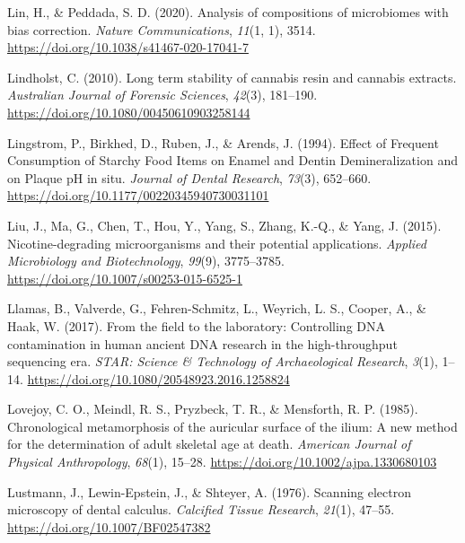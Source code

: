 \documentclass[
  letterpaper,
]{book}
\newlength{\cslhangindent}
\newlength{\cslentryspacingunit} %
\newenvironment{CSLReferences}[2] %
 {%
  \setlength{\parindent}{0pt}
  \ifodd #1
  \let\oldpar\par
  \def\par{\hangindent=\cslhangindent\oldpar}
  \fi
  \setlength{\parskip}{#2\cslentryspacingunit}
 }%
 {}
\begin{document}
\begin{CSLReferences}{1}{0}
\leavevmode{}%
Lin, H., \& Peddada, S. D. (2020). Analysis of compositions of
microbiomes with bias correction. \emph{Nature Communications},
\emph{11}(1, 1), 3514. \url{https://doi.org/10.1038/s41467-020-17041-7}

\leavevmode{}%
Lindholst, C. (2010). Long term stability of cannabis resin and cannabis
extracts. \emph{Australian Journal of Forensic Sciences}, \emph{42}(3),
181--190. \url{https://doi.org/10.1080/00450610903258144}

\leavevmode{}%
Lingstrom, P., Birkhed, D., Ruben, J., \& Arends, J. (1994). Effect of
{Frequent Consumption} of {Starchy Food Items} on {Enamel} and {Dentin
Demineralization} and on {Plaque pH} in situ. \emph{Journal of Dental
Research}, \emph{73}(3), 652--660.
\url{https://doi.org/10.1177/00220345940730031101}

\leavevmode{}%
Liu, J., Ma, G., Chen, T., Hou, Y., Yang, S., Zhang, K.-Q., \& Yang, J.
(2015). Nicotine-degrading microorganisms and their potential
applications. \emph{Applied Microbiology and Biotechnology},
\emph{99}(9), 3775--3785.
\url{https://doi.org/10.1007/s00253-015-6525-1}

\leavevmode{}%
Llamas, B., Valverde, G., Fehren-Schmitz, L., Weyrich, L. S., Cooper,
A., \& Haak, W. (2017). From the field to the laboratory: {Controlling
DNA} contamination in human ancient {DNA} research in the
high-throughput sequencing era. \emph{STAR: Science \& Technology of
Archaeological Research}, \emph{3}(1), 1--14.
\url{https://doi.org/10.1080/20548923.2016.1258824}

\leavevmode{}%
Lovejoy, C. O., Meindl, R. S., Pryzbeck, T. R., \& Mensforth, R. P.
(1985). Chronological metamorphosis of the auricular surface of the
ilium: {A} new method for the determination of adult skeletal age at
death. \emph{American Journal of Physical Anthropology}, \emph{68}(1),
15--28. \url{https://doi.org/10.1002/ajpa.1330680103}

\leavevmode{}%
Lustmann, J., Lewin-Epstein, J., \& Shteyer, A. (1976). Scanning
electron microscopy of dental calculus. \emph{Calcified Tissue
Research}, \emph{21}(1), 47--55.
\url{https://doi.org/10.1007/BF02547382}


\end{CSLReferences}
\end{document}
